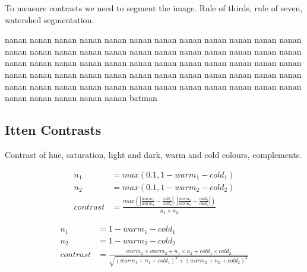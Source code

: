 \documentclass[11pt,a4paper]{report}
\begin{document}
\begin{multicols}{2}
To measure contrasts we need to segment the image.  Rule of thirds, rule of
seven, watershed segmentation.

nanan nanan nanan nanan nanan nanan nanan nanan nanan nanan nanan nanan nanan
nanan nanan nanan nanan nanan nanan nanan nanan nanan nanan nanan nanan nanan
nanan nanan nanan nanan nanan nanan nanan nanan nanan nanan nanan nanan nanan
nanan nanan nanan nanan nanan nanan nanan nanan nanan nanan nanan nanan nanan
nanan nanan nanan nanan nanan nanan nanan nanan nanan nanan nanan nanan nanan
batman

\subsection{Itten Contrasts}

Contrast of hue, saturation, light and dark, warm and cold colours,
complements.

\begin{figure}[!htb]
\begin{equation}
\begin{aligned}
n_1       &= max(0.1, 1 - warm_1 - cold_1) \\
n_2       &= max(0.1, 1 - warm_2 - cold_2) \\
contrast  &= \frac{ max\left( \left\lvert \frac{warm_1}{warm_2}
                                        - \frac{cold_1}{cold_2} \right\rvert
                            , \left\lvert \frac{warm_2}{warm_1}
                                        - \frac{cold_2}{cold_1} \right\rvert
                       \right)
                 }{ n_1 \times n_2 }
\label{eqcoldwarm}
\end{aligned}
\end{equation}
\end{figure}

\begin{figure}[!htb]
\begin{equation}
\begin{aligned}
n_1       &= 1 - warm_1 - cold_1 \\
n_2       &= 1 - warm_2 - cold_2 \\
contrast  &= \frac{ warm_1 \times warm_2
                   + n_1    \times n_2
                   + cold_1 \times cold_2
                  }{ \sqrt{ (warm_1 + n_1 + cold_1)^2
                          + (warm_2 + n_2 + cold_2)^2 } }
\label{eqmach}
\end{aligned}
\end{equation}
\end{figure}


\end{multicols}
\end{document}
